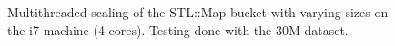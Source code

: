 \begin{landscape}
\begin{figure}[H]
{    }
    \label{fig:ts_i7_30m_map}
    \caption{Multithreaded scaling of the STL::Map bucket with varying sizes on the
    i7 machine (4 cores). Testing done with the 30M dataset.}
\end{figure}
\begin{figure}[H]
\end{figure}
\end{landscape}
